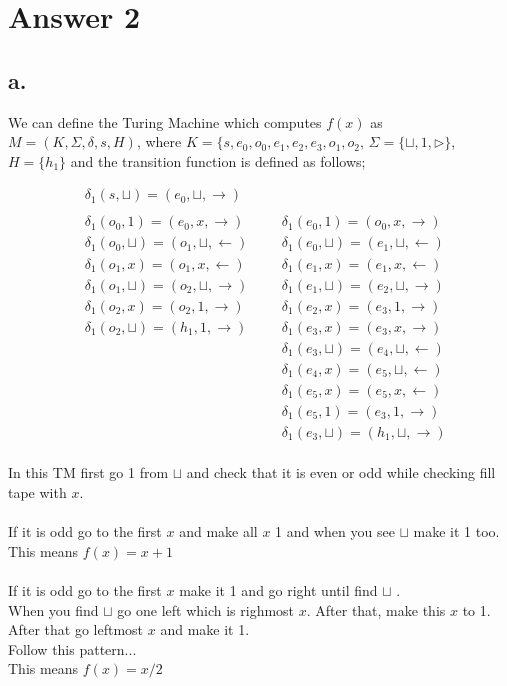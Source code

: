 \documentclass[12pt]{article}
\begin{document}
\section*{Answer 2}

\subsection*{a.}
We can define the Turing Machine which computes $f(x)$ as $M = (K,\Sigma,\delta, s, H)$, where
$K = \{s,e_0,o_0,e_1,e_2,e_3,o_1,o_2$, $\Sigma = \{\sqcup,1,\triangleright\}$, $H = \{h_1\}
$ and the transition function is defined as follows;

\begin{align*}
&\delta_1(s,\sqcup) = (e_0,\sqcup,\rightarrow) \\\\
&\delta_1(o_0,1) = (e_0,x,\rightarrow) && &\delta_1(e_0,1) = (o_0,x,\rightarrow) \\
&\delta_1(o_0,\sqcup) = (o_1,\sqcup,\leftarrow) && &\delta_1(e_0,\sqcup) = (e_1,\sqcup,\leftarrow) \\
&\delta_1(o_1,x) = (o_1,x,\leftarrow) && &\delta_1(e_1,x) = (e_1,x,\leftarrow) \\
&\delta_1(o_1,\sqcup) = (o_2,\sqcup,\rightarrow) && &\delta_1(e_1,\sqcup) = (e_2,\sqcup,\rightarrow)\\
&\delta_1(o_2,x) = (o_2,1,\rightarrow) && &\delta_1(e_2,x) = (e_3,1,\rightarrow) \\
&\delta_1(o_2,\sqcup) = (h_1,1,\rightarrow) && &\delta_1(e_3,x) = (e_3,x,\rightarrow) \\
& &&  &\delta_1(e_3,\sqcup) = (e_4,\sqcup,\leftarrow) \\
& &&  &\delta_1(e_4,x) = (e_5,\sqcup,\leftarrow) \\
& &&  &\delta_1(e_5,x) = (e_5,x,\leftarrow) \\
& &&  &\delta_1(e_5,1) = (e_3,1,\rightarrow) \\
& &&  &\delta_1(e_3,\sqcup) = (h_1,\sqcup,\rightarrow)
\end{align*}
\\
In this TM first go 1 from $\sqcup$ and check that it is even or odd while checking fill tape with $x$. \\\\
If it is odd go to the first $x$ and make all $x$ 1 and when you see $\sqcup$ make it 1 too. \\
This means $f(x) = x + 1$\\\\
If it is odd go to the first $x$ make it 1 and go right until find $\sqcup$ .\\
When you find $\sqcup$ go one left which is righmost $x$.
After that, make this $x$ to 1.\\
After that go leftmost $x$ and make it 1.\\
Follow this pattern...\\
This means $f(x) = x / 2$
\end{document}
